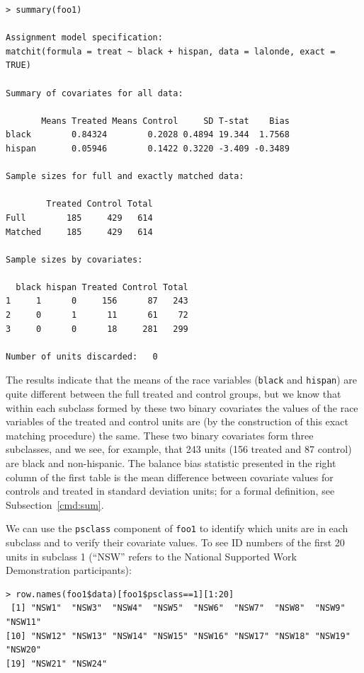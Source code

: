 \documentclass[oneside,letterpaper,titlepage]{article}
\begin{document}
\begin{verbatim}
> summary(foo1)
 
Assignment model specification:
matchit(formula = treat ~ black + hispan, data = lalonde, exact = TRUE)
 
Summary of covariates for all data:
 
       Means Treated Means Control     SD T-stat    Bias
black        0.84324        0.2028 0.4894 19.344  1.7568
hispan       0.05946        0.1422 0.3220 -3.409 -0.3489
  
Sample sizes for full and exactly matched data:
 
        Treated Control Total
Full        185     429   614
Matched     185     429   614
 
Sample sizes by covariates:
 
  black hispan Treated Control Total
1     1      0     156      87   243
2     0      1      11      61    72
3     0      0      18     281   299
 
Number of units discarded:   0
\end{verbatim}
The results indicate that the means of the race variables ({\tt black}
and {\tt hispan}) are quite different between the full treated and
control groups, but we know that within each subclass formed by these
two binary covariates the values of the race variables of the treated
and control units are (by the construction of this exact matching
procedure) the same.  These two binary covariates form three
subclasses, and we see, for example, that 243 units (156 treated and
87 control) are black and non-hispanic.  The balance bias statistic
presented in the right column of the first table is the mean
difference between covariate values for controls and treated in
standard deviation units; for a formal definition, see
Subsection~\ref{cmd:sum}.

We can use the {\tt psclass} component of {\tt foo1} to identify which
units are in each subclass and to verify their covariate values.  To
see ID numbers of the first 20 units in subclass 1 (``NSW'' refers to
the National Supported Work Demonstration participants):
\begin{verbatim}
> row.names(foo1$data)[foo1$psclass==1][1:20]
 [1] "NSW1"  "NSW3"  "NSW4"  "NSW5"  "NSW6"  "NSW7"  "NSW8"  "NSW9"  "NSW11"
[10] "NSW12" "NSW13" "NSW14" "NSW15" "NSW16" "NSW17" "NSW18" "NSW19" "NSW20"
[19] "NSW21" "NSW24"
\end{verbatim}
\end{document}
